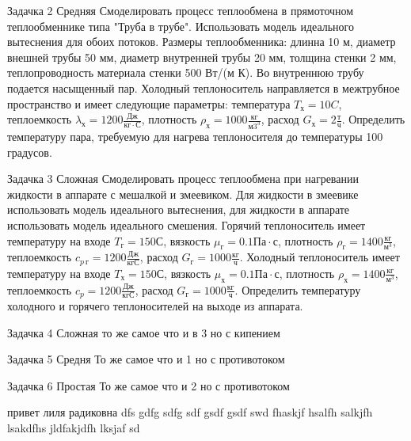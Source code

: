 Задачка 2 Средняя
Смоделировать процесс теплообмена в прямоточном теплообменнике типа "Труба в трубе". Использовать модель идеального вытеснения для обоих потоков. Размеры теплообменника: длинна 10 м, диаметр внешней трубы 50 мм, диаметр внутренней трубы 20 мм, толщина стенки 2 мм, теплопроводность материала стенки 500 Вт/(м К). Во внутреннюю трубу подается насыщенный пар. Холодный теплоноситель направляется в межтрубное пространство и имеет следующие параметры: температура $T_х=10 C$, теплоемкость $\lambda_х=1200\frac{Дж}{кг \cdot С}$, плотность $\rho_х=1000 \frac{кг}{м3^3}$, расход $G_х=2 \frac{т}{ч}$.
Определить температуру пара, требуемую для нагрева теплоносителя до температуры 100 градусов. 

Задачка 3 Сложная
Смоделировать процесс теплообмена при нагревании жидкости в аппарате с мешалкой и змеевиком. Для жидкости в змеевике использовать модель идеального вытеснения, для жидкости в аппарате использовать модель идеального смешения. Горячий теплоноситель имеет температуру на входе $T_г=150 С$, вязкость $\mu_г=0.1 Па\cdot с$, плотность  $\rho_г= 1400 \frac{кг}{м^3}$, теплоемкость $c_{p\ г}=1200 \frac{Дж}{кг С}$, расход $G_г=1000 \frac{кг}{ч}$. Холодный теплоноситель имеет температуру на входе $T_х=150 С$, вязкость $\mu_х=0.1 Па\cdot с$, плотность  $\rho_х= 1400 \frac{кг}{м^3}$, теплоемкость $c_p=1200 \frac{Дж}{кг С}$, расход $G_г=1000 \frac{кг}{ч}$. Определить температуру холодного и горячего теплоносителей на выходе из аппарата.

Задачка 4 Сложная то же самое что и в 3 но с кипением

Задачка 5 Средня То же самое что и 1 но с противотоком

Задачка 6 Простая То же самое что и 2 но с противотоком

привет лиля радиковна
dfs gdfg sdfg sdf gsdf gsdf 
swd fhaskjf hsalfh salkjfh lsakdfhs jldfakjdfh lksjaf sd